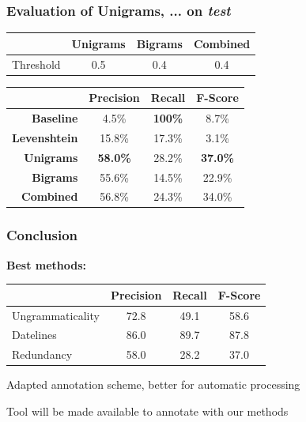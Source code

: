 \documentclass[table]{beamer}
\begin{document}
\begin{frame}
  \frametitle{Evaluation of \textbf{Unigrams}, ... on \textit{test}}
  \begin{tabular}{r|c|c|c|}
    & \textbf{Unigrams} & \textbf{Bigrams} & \textbf{Combined}\\
  \hline
  Threshold & 0.5 & 0.4 & 0.4
  \end{tabular}
  \vspace{1cm}

  \begin{tabular}{r|c|c|c|}
  & Precision & Recall & F-Score \\
  \hline
  \textbf{Baseline} & 4.5\% & \textbf{100\%} & 8.7\% \\
  \hline
  \textbf{Levenshtein} & 15.8\% & 17.3\% & 3.1\% \\
  \hline
  \textbf{Unigrams} & \textbf{58.0\%} & 28.2\% & \textbf{37.0\%} \\
  \hline
  \textbf{Bigrams} & 55.6\% & 14.5\% & 22.9\% \\
  \hline
  \textbf{Combined} & 56.8\% & 24.3\% & 34.0\% \\
  \hline
  \end{tabular}
  \vspace{0.5cm}
\end{frame}

\begin{frame}
  \frametitle{Conclusion}

  \textbf{Best methods:}
  \vspace{0.5cm}

  \begin{tabular}{l|c|c|c|}
  \hline
   & Precision & Recall & F-Score\\
  \hline
  Ungrammaticality & 72.8 & 49.1 & 58.6\\
  \hline
  Datelines & 86.0 & 89.7 & 87.8\\
  \hline
  Redundancy & 58.0 & 28.2 & 37.0\\
  \hline
  \end{tabular}\pause

  \vspace{0.5cm}
  Adapted annotation scheme, better for automatic processing\pause

  \vspace{0.5cm}
  Tool will be made available to annotate with our methods
\end{frame}
\end{document}
